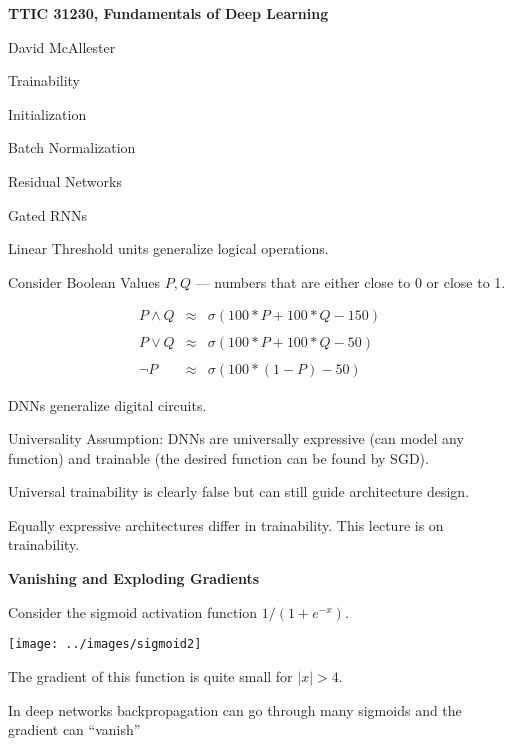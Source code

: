 




{\Huge

  \centerline{\bf TTIC 31230, Fundamentals of Deep Learning}
  \bigskip
  \centerline{David McAllester}
  \vfill
  \centerline{Trainability}
  \vfill
  \vfill
  \centerline{Initialization}
  \vfill
  \centerline{Batch Normalization}
  \vfill
  \centerline{Residual Networks}
  \vfill
  \centerline{Gated RNNs}


Linear Threshold units generalize logical operations.

\vfill
Consider Boolean Values $P,Q$ --- numbers that are either close to 0 or close to 1.

\vfill
\begin{eqnarray*}
P \wedge Q & \approx & \sigma(100*P + 100* Q -150) \\
\\
P \vee Q & \approx & \sigma(100*P + 100* Q -50) \\
\\
\neg P & \approx & \sigma(100*(1-P) - 50)
\end{eqnarray*}

\vfill
DNNs generalize digital circuits.


{\color{red} Universality Assumption:} DNNs are universally expressive (can model any function) and trainable (the desired function can be found by SGD).

\vfill
Universal trainability is clearly false but can still guide architecture design.

\vfill
Equally expressive architectures differ in trainability.  This lecture is on trainability.

\slide{}

\centerline{\bf Vanishing and Exploding Gradients}
\vfill
\vfill


Consider the sigmoid activation function $1/(1+ e^{-x})$.

\vfill
\centerline{\texttt{[image: ../images/sigmoid2]}}


\vfill
The gradient of this function is quite small for $|x| > 4$.

\vfill
In deep networks backpropagation can go through many sigmoids and
the gradient can ``vanish''

}
